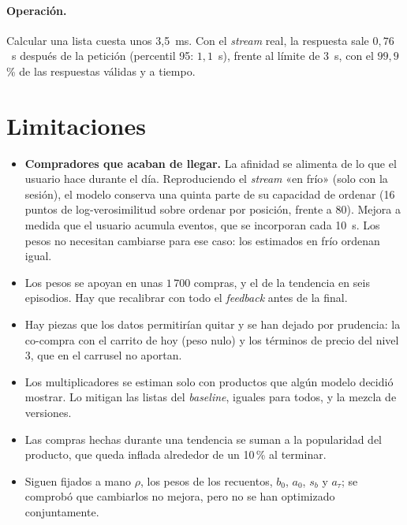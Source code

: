 \documentclass[11pt,a4paper]{article}
\begin{document}
\paragraph{Operación.} Calcular una lista cuesta unos 3{,}5~ms. Con el \emph{stream} real, la respuesta
sale $0{,}76$~s después de la petición (percentil 95: $1{,}1$~s), frente al límite de 3~s, con el
$99{,}9$\,\% de las respuestas válidas y a tiempo.

\section{Limitaciones}

\begin{itemize}\setlength{\itemsep}{0.15em}
\item \textbf{Compradores que acaban de llegar.} La afinidad se alimenta de lo que el usuario hace durante
el día. Reproduciendo el \emph{stream} «en frío» (solo con la sesión), el modelo conserva una quinta parte
de su capacidad de ordenar (16 puntos de log-verosimilitud sobre ordenar por posición, frente a 80).
Mejora a medida que el usuario acumula eventos, que se incorporan cada 10~s. Los pesos no necesitan
cambiarse para ese caso: los estimados en frío ordenan igual.
\item Los pesos se apoyan en unas $1\,700$ compras, y el de la tendencia en seis episodios. Hay que
recalibrar con todo el \emph{feedback} antes de la final.
\item Hay piezas que los datos permitirían quitar y se han dejado por prudencia: la co-compra con el
carrito de hoy (peso nulo) y los términos de precio del nivel 3, que en el carrusel no aportan.
\item Los multiplicadores se estiman solo con productos que algún modelo decidió mostrar. Lo mitigan las
listas del \emph{baseline}, iguales para todos, y la mezcla de versiones.
\item Las compras hechas durante una tendencia se suman a la popularidad del producto, que queda inflada
alrededor de un 10\,\% al terminar.
\item Siguen fijados a mano $\rho$, los pesos de los recuentos, $b_0$, $a_0$, $s_b$ y $a_\tau$; se
comprobó que cambiarlos no mejora, pero no se han optimizado conjuntamente.
\end{itemize}
\end{document}
